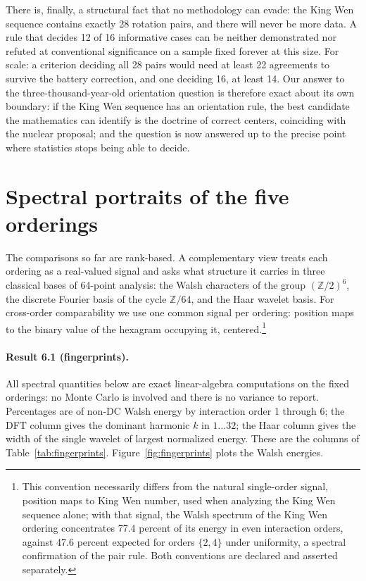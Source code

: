 \documentclass[11pt]{article}
\begin{document}
There is, finally, a structural fact that no methodology can evade: the King Wen sequence contains exactly 28 rotation pairs, and there will never be more data. A rule that decides 12 of 16 informative cases can be neither demonstrated nor refuted at conventional significance on a sample fixed forever at this size. For scale: a criterion deciding all 28 pairs would need at least 22 agreements to survive the battery correction, and one deciding 16, at least 14. Our answer to the three-thousand-year-old orientation question is therefore exact about its own boundary: if the King Wen sequence has an orientation rule, the best candidate the mathematics can identify is the doctrine of correct centers, coinciding with the nuclear proposal; and the question is now answered up to the precise point where statistics stops being able to decide.

\section{Spectral portraits of the five orderings}
\label{sec:spectral}

The comparisons so far are rank-based. A complementary view treats each ordering as a real-valued signal and asks what structure it carries in three classical bases of 64-point analysis: the Walsh characters of the group $(\mathbb{Z}/2)^6$, the discrete Fourier basis of the cycle $\mathbb{Z}/64$, and the Haar wavelet basis. For cross-order comparability we use one common signal per ordering: position maps to the binary value of the hexagram occupying it, centered.\footnote{This convention necessarily differs from the natural single-order signal, position maps to King Wen number, used when analyzing the King Wen sequence alone; with that signal, the Walsh spectrum of the King Wen ordering concentrates 77.4 percent of its energy in even interaction orders, against 47.6 percent expected for orders $\{2,4\}$ under uniformity, a spectral confirmation of the pair rule. Both conventions are declared and asserted separately.}

\paragraph{Result 6.1 (fingerprints).} All spectral quantities below are exact linear-algebra computations on the fixed orderings: no Monte Carlo is involved and there is no variance to report. Percentages are of non-DC Walsh energy by interaction order 1 through 6; the DFT column gives the dominant harmonic $k$ in $1 \ldots 32$; the Haar column gives the width of the single wavelet of largest normalized energy. These are the columns of Table~\ref{tab:fingerprints}. Figure~\ref{fig:fingerprints} plots the Walsh energies.
\end{document}
